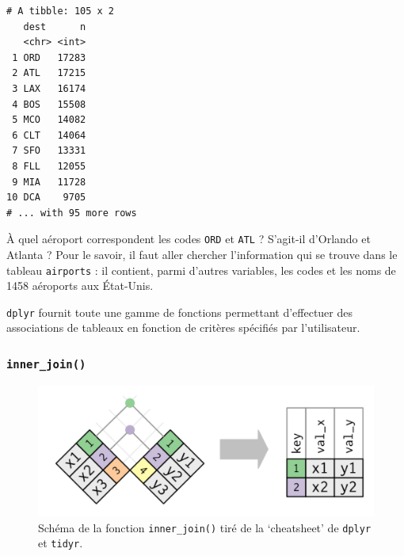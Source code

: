 \documentclass[a4paperpaper,]{article}
\newenvironment{Shaded}{\begin{snugshade}}{\end{snugshade}}
\newcommand{\KeywordTok}[1]{\textcolor[rgb]{0.12,0.11,0.11}{\textbf{#1}}}
\newcommand{\NormalTok}[1]{\textcolor[rgb]{0.12,0.11,0.11}{#1}}
\newcommand{\OperatorTok}[1]{\textcolor[rgb]{0.12,0.11,0.11}{#1}}
\newcommand{\StringTok}[1]{\textcolor[rgb]{0.75,0.01,0.01}{#1}}
\begin{document}
\begin{Shaded}
\end{Shaded}

\begin{verbatim}
# A tibble: 105 x 2
   dest      n
   <chr> <int>
 1 ORD   17283
 2 ATL   17215
 3 LAX   16174
 4 BOS   15508
 5 MCO   14082
 6 CLT   14064
 7 SFO   13331
 8 FLL   12055
 9 MIA   11728
10 DCA    9705
# ... with 95 more rows
\end{verbatim}

À quel aéroport correspondent les codes \texttt{ORD} et \texttt{ATL} ? S'agit-il d'Orlando et Atlanta ? Pour le savoir, il faut aller chercher l'information qui se trouve dans le tableau \texttt{airports} : il contient, parmi d'autres variables, les codes et les noms de 1458 aéroports aux État-Unis.

\texttt{dplyr} fournit toute une gamme de fonctions permettant d'effectuer des associations de tableaux en fonction de critères spécifiés par l'utilisateur.

\hypertarget{inner_join}{%
\subsubsection{\texorpdfstring{\texttt{inner\_join()}}{inner\_join()}}\label{inner_join}}

\begin{figure}[htpb]

{\centering \includegraphics[width=0.5\linewidth]{images/innerjoin} 

}

\caption{Schéma de la fonction \texttt{inner\_join()} tiré de la `cheatsheet' de \texttt{dplyr} et \texttt{tidyr}.}\label{fig:inner}
\end{figure}
\end{document}
